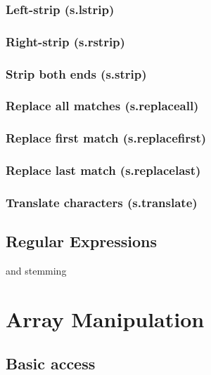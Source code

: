 \documentclass{article}
\theoremstyle{definition}
\begin{document}
\subsubsection{Left-strip (s.lstrip)}

\subsubsection{Right-strip (s.rstrip)}

\subsubsection{Strip both ends (s.strip)}

\subsubsection{Replace all matches (s.replaceall)}

\subsubsection{Replace first match (s.replacefirst)}

\subsubsection{Replace last match (s.replacelast)}

\subsubsection{Translate characters (s.translate)}

\subsection{Regular Expressions}

and stemming

\pagebreak

\section{Array Manipulation}

\subsection{Basic access}
\end{document}
